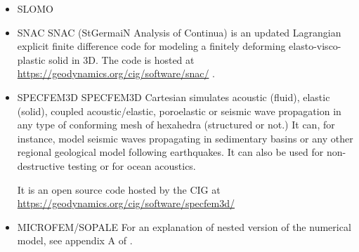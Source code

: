 \begin{itemize}
{\small
\noindent
\cite{poso08}
\cite{qusp10}
\cite{brps12}
\cite{brps13}
\cite{brau13}
\cite{brun14}
\cite{hebr14}
\cite{kobf14}
\cite{clbq15}
\cite{brcr17}
\cite{basq18}\cite{osss18}\cite{osss18b}
}

\item {\codefont SLOMO} 

{\small
\noindent
\cite{kaus05}
\cite{kasb08}
}

\item {\codefont SNAC} 
SNAC (StGermaiN Analysis of Continua) is an updated Lagrangian explicit finite 
difference code for modeling a finitely deforming elasto-visco-plastic solid in 3D.
The code is hosted at \url{https://geodynamics.org/cig/software/snac/} .

{\small
\noindent
\cite{chlg08}
\cite{chgu08}
\cite{qula10}
\cite{chss11}
}

\item {\codefont SPECFEM3D} 
SPECFEM3D Cartesian simulates acoustic (fluid), elastic (solid), coupled acoustic/elastic, 
poroelastic or seismic wave propagation in any type of conforming mesh of hexahedra 
(structured or not.) It can, for instance, model seismic waves propagating in sedimentary 
basins or any other regional geological model following earthquakes. It can also be used 
for non-destructive testing or for ocean acoustics. 

It is an open source code hosted by the CIG at 
\url{https://geodynamics.org/cig/software/specfem3d/}

{\small
\noindent
\cite{kott05}
}

\item {\codefont MICROFEM}/{\codefont SOPALE} 
For an explanation of nested version of the numerical model, see appendix A of \cite{webe18}.


\end{itemize}
